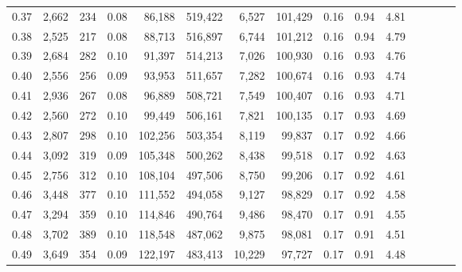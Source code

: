 \begin{tabular}{rrrcrrrrrrrrrrr}
0.37 &   2,662 &    234 &                                       0.08 &   86,188 &  519,422 &    6,527 &  101,429 &  0.16 &  0.94 &                         4.81 \\
0.38 &   2,525 &    217 &                                       0.08 &   88,713 &  516,897 &    6,744 &  101,212 &  0.16 &  0.94 &                         4.79 \\
0.39 &   2,684 &    282 &                                       0.10 &   91,397 &  514,213 &    7,026 &  100,930 &  0.16 &  0.93 &                         4.76 \\
0.40 &   2,556 &    256 &                                       0.09 &   93,953 &  511,657 &    7,282 &  100,674 &  0.16 &  0.93 &                         4.74 \\
0.41 &   2,936 &    267 &                                       0.08 &   96,889 &  508,721 &    7,549 &  100,407 &  0.16 &  0.93 &                         4.71 \\
0.42 &   2,560 &    272 &                                       0.10 &   99,449 &  506,161 &    7,821 &  100,135 &  0.17 &  0.93 &                         4.69 \\
0.43 &   2,807 &    298 &                                       0.10 &  102,256 &  503,354 &    8,119 &   99,837 &  0.17 &  0.92 &                         4.66 \\
0.44 &   3,092 &    319 &                                       0.09 &  105,348 &  500,262 &    8,438 &   99,518 &  0.17 &  0.92 &                         4.63 \\
0.45 &   2,756 &    312 &                                       0.10 &  108,104 &  497,506 &    8,750 &   99,206 &  0.17 &  0.92 &                         4.61 \\
0.46 &   3,448 &    377 &                                       0.10 &  111,552 &  494,058 &    9,127 &   98,829 &  0.17 &  0.92 &                         4.58 \\
0.47 &   3,294 &    359 &                                       0.10 &  114,846 &  490,764 &    9,486 &   98,470 &  0.17 &  0.91 &                         4.55 \\
0.48 &   3,702 &    389 &                                       0.10 &  118,548 &  487,062 &    9,875 &   98,081 &  0.17 &  0.91 &                         4.51 \\
0.49 &   3,649 &    354 &                                       0.09 &  122,197 &  483,413 &   10,229 &   97,727 &  0.17 &  0.91 &                         4.48 \\

\end{tabular}
